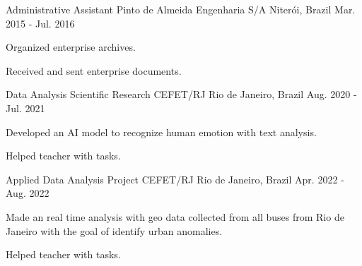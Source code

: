 

\begin{cventries}

  \cventry
    {Administrative Assistant} %
    {Pinto de Almeida Engenharia S/A} %
    {Niterói, Brazil} %
    {Mar. 2015 - Jul. 2016} %
    {
      \begin{cvitems} %
        \item {Organized enterprise archives.}
        \item {Received and sent enterprise documents.}
      \end{cvitems}
    }

  \cventry
    {Data Analysis Scientific Research} %
    {CEFET/RJ} %
    {Rio de Janeiro, Brazil} %
    {Aug. 2020 - Jul. 2021} %
    {
      \begin{cvitems} %
        \item {Developed an AI model to recognize human emotion with text analysis.}
        \item {Helped teacher with tasks.}
      \end{cvitems}
    }

  \cventry
    {Applied Data Analysis Project} %
    {CEFET/RJ} %
    {Rio de Janeiro, Brazil} %
    {Apr. 2022 - Aug. 2022} %
    {
      \begin{cvitems} %
        \item {Made an real time analysis with geo data collected from all buses from Rio de Janeiro with the goal of identify urban anomalies.}
        \item {Helped teacher with tasks.}
      \end{cvitems}
    }

\end{cventries}
